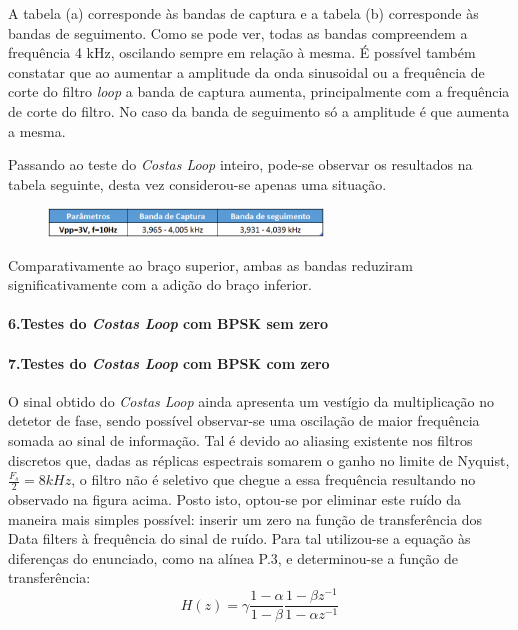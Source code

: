 \documentclass[11pt]{article}
\numberwithin{equation}{section}
\begin{document}
A tabela (a) corresponde às bandas de captura e a tabela (b) corresponde às bandas de seguimento. Como se pode ver, todas as bandas compreendem a frequência 4 kHz, oscilando sempre em relação à mesma.
É possível também constatar que ao aumentar a amplitude da onda sinusoidal ou a frequência de corte do filtro \textit{loop} a banda de captura aumenta, principalmente com a frequência de corte do filtro. No caso da banda de seguimento só a amplitude é que aumenta a mesma.

Passando ao teste do \textit{Costas Loop} inteiro, pode-se observar os resultados na tabela seguinte, desta vez considerou-se apenas uma situação. 
\begin{figure}[H]
	\centering
	\includegraphics[width=0.65\textwidth]{./tab_costa}~\\
\end{figure}

Comparativamente ao braço superior, ambas as bandas reduziram significativamente com a adição do braço inferior.

\paragraph{6.Testes do \textit{Costas Loop} com BPSK sem zero} \hspace{0pt} \label{para:P3-6}

\paragraph{7.Testes do \textit{Costas Loop} com BPSK com zero} \hspace{0pt} \label{para:P3-7}

O sinal obtido do \textit{Costas Loop} ainda apresenta um vestígio da multiplicação no detetor de fase, sendo possível observar-se uma oscilação de maior frequência somada ao sinal de informação. Tal é devido ao aliasing existente nos filtros discretos que, dadas as réplicas espectrais somarem o ganho no limite de Nyquist, $\frac{F_s}{2} = 8kHz$, o filtro  não é seletivo que chegue a essa frequência resultando no observado na figura acima. Posto isto, optou-se por eliminar este ruído da maneira mais simples possível: inserir um zero na função de transferência dos Data filters à frequência do sinal de ruído. Para tal utilizou-se a equação às diferenças do enunciado, como na alínea P.3, e determinou-se a função de transferência:
\begin{equation}
H(z) = \gamma\frac{1-\alpha}{1-\beta}\dfrac{1-\beta z^{-1}}{1-\alpha z^{-1}}
\end{equation}
\end{document}
